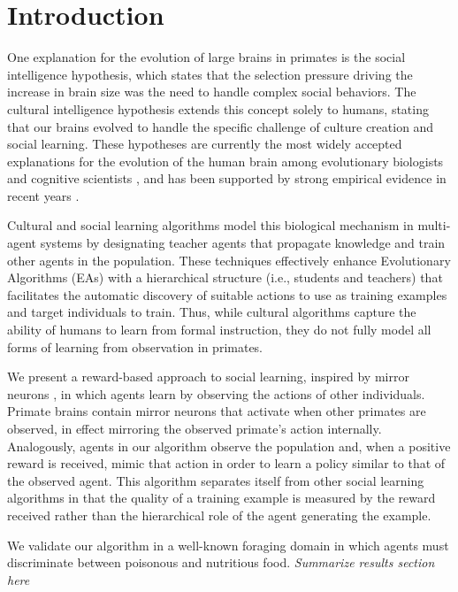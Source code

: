 \documentclass{acm_proc_article-sp}
\begin{document}

\section{Introduction}

One explanation for the evolution of large brains in primates is the social intelligence hypothesis, which states that the selection pressure driving the increase in brain size was the need to handle complex social behaviors. The cultural intelligence hypothesis extends this concept solely to humans, stating that our brains evolved to handle the specific challenge of culture creation and social learning. These hypotheses are currently the most widely accepted explanations for the evolution of the human brain among evolutionary biologists and cognitive scientists \cite{holekamp2007questioning}, and has been supported by strong empirical evidence in recent years \cite{herrmann2007humans}.

Cultural and social learning algorithms \cite{reynolds1994introduction} model this biological mechanism in multi-agent systems by designating teacher agents that propagate knowledge and train other agents in the population. These techniques effectively enhance Evolutionary Algorithms (EAs) with a hierarchical structure (i.e., students and teachers) that facilitates the automatic discovery of suitable actions to use as training examples and target individuals to train. Thus, while cultural algorithms capture the ability of humans to learn from formal instruction, they do not fully model all forms of learning from observation in primates.

We present a reward-based approach to social learning, inspired by mirror neurons \cite{gallese-98}, in which agents learn by observing the actions of other individuals. Primate brains contain mirror neurons that activate when other primates are observed, in effect mirroring the observed primate's action internally. Analogously, agents in our algorithm observe the population and, when a positive reward is received, mimic that action in order to learn a policy similar to that of the observed agent. This algorithm separates itself from other social learning algorithms in that the quality of a training example is measured by the reward received rather than the hierarchical role of the agent generating the example.

We validate our algorithm in a well-known foraging domain in which agents must discriminate between poisonous and nutritious food. \textit{Summarize results section here}
\end{document}
